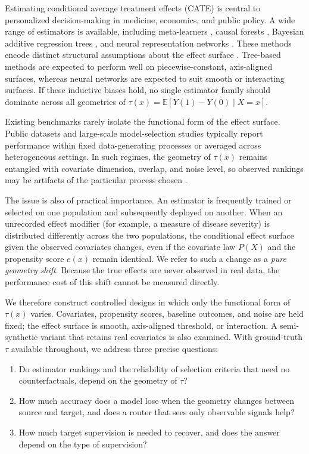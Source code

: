 \documentclass[pdflatex,sn-mathphys-num]{sn-jnl}
\begin{document}
Estimating conditional average treatment effects (CATE) is central to personalized decision-making in medicine, economics, and public policy. A wide range of estimators is available, including meta-learners \citep{kunzel2019,nie2021,kennedy2023}, causal forests \citep{wager2018,athey2019}, Bayesian additive regression trees \citep{hill2011,chipman2010}, and neural representation networks \citep{shalit2017,johansson2016,shi2019}. These methods encode distinct structural assumptions about the effect surface \citep{curth2021}. Tree-based methods are expected to perform well on piecewise-constant, axis-aligned surfaces, whereas neural networks are expected to suit smooth or interacting surfaces. If these inductive biases hold, no single estimator family should dominate across all geometries of $\tau(x)=\mathbb{E}[Y(1)-Y(0)\mid X=x]$.

Existing benchmarks rarely isolate the functional form of the effect surface. Public datasets \citep{hill2011,dorie2019} and large-scale model-selection studies \citep{mahajan2024} typically report performance within fixed data-generating processes or averaged across heterogeneous settings. In such regimes, the geometry of $\tau(x)$ remains entangled with covariate dimension, overlap, and noise level, so observed rankings may be artifacts of the particular process chosen \citep{curth2021benchmark}.

The issue is also of practical importance. An estimator is frequently trained or selected on one population and subsequently deployed on another. When an unrecorded effect modifier (for example, a measure of disease severity) is distributed differently across the two populations, the conditional effect surface given the observed covariates changes, even if the covariate law $P(X)$ and the propensity score $e(x)$ remain identical. We refer to such a change as a \emph{pure geometry shift}. Because the true effects are never observed in real data, the performance cost of this shift cannot be measured directly.

We therefore construct controlled designs in which only the functional form of $\tau(x)$ varies. Covariates, propensity scores, baseline outcomes, and noise are held fixed; the effect surface is smooth, axis-aligned threshold, or interaction. A semi-synthetic variant that retains real covariates is also examined. With ground-truth $\tau$ available throughout, we address three precise questions:
\begin{enumerate}
  \item[\textbf{Q1}] Do estimator rankings and the reliability of selection criteria that need no counterfactuals, depend on the geometry of $\tau$?
  \item[\textbf{Q2}] How much accuracy does a model lose when the geometry changes between source and target, and does a router that sees only observable signals help?
  \item[\textbf{Q3}] How much target supervision is needed to recover, and does the answer depend on the type of supervision?
\end{enumerate}
\end{document}
